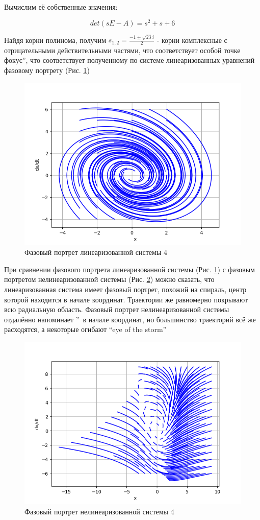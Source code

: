 Вычислим её собственные значения:

$$
det(sE - A) = s^2 + s + 6
$$

Найдя корни полинома, получим $s_{1,2} = \frac{-1\pm\sqrt{23}i}{2}$ - корни комплексные с отрицательными действительными частями, 
что соответствует особой точке  фокус\textquotedblright, 
что соответствует полученному по системе линеаризованных уравнений фазовому портрету (Рис. \ref{fig:7})

\begin{figure}[H]
	\centering
	\includegraphics[width=0.6\linewidth]{body/images/Linearized-system-4.png}
	\caption{Фазовый портрет линеаризованной системы 4}
	\label{fig:7}
\end{figure}

При сравнении фазового портрета линеаризованной системы (Рис. \ref{fig:7}) с фазовым портретом нелинеаризованной системы
(Рис. \ref{fig:8}) можно сказать, что линеаризованная система имеет фазовый портрет, похожий на спираль, центр которой
находится в начале координат. Траектории же равномерно покрывают всю радиальную область. Фазовый портрет нелинеаризованной
системы отдалённо напоминает \textquotedblright\ в начале координат, но большинство траекторий
всё же расходятся, а некоторые огибают \textquotedblleft eye of the storm\textquotedblright

\begin{figure}[H]
	\centering
	\includegraphics[width=0.6\linewidth]{body/images/System-4.png}
	\caption{Фазовый портрет нелинеаризованной системы 4}
	\label{fig:8}
\end{figure}

